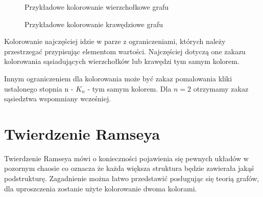 \documentclass[11pt]{article}
\begin{document}
    \begin{figure}[H]
      \centering
        \caption{Przykładowe kolorowanie wierzchołkowe grafu}
     \end{figure}

    \begin{figure}[H]
      \centering
        \caption{Przykładowe kolorowanie krawędziowe grafu}
     \end{figure}

     Kolorowanie najczęściej idzie w parze z ograniczeniami, których należy przestrzegać przypisując elementom wartości.
     Najczęściej dotyczą one zakazu kolorowania sąsiadujących wierzchołków lub krawędzi tym samym kolorem. 

     Innym ograniczeniem dla kolorowania może być zakaz pomalowania kliki ustalonego stopnia n - $K_n$ - tym samym kolorem.
     Dla $n=2$ otrzymamy zakaz sąsiedztwa wspomniany wcześniej.  
     

\section{Twierdzenie Ramseya}

Twierdzenie Ramseya mówi o konieczności pojawienia się pewnych układów w pozornym chaosie co oznacza że każda większa struktura będzie zawierała jakąś podstrukturę. Zagadnienie można łatwo przedstawić posługując się teorią grafów, dla uproszczenia zostanie użyte kolorowanie dwoma kolorami.
\end{document}
